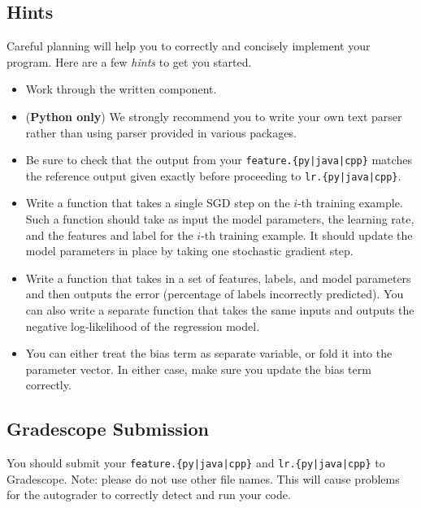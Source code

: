 \documentclass[11pt,addpoints,answers]{exam}
\begin{document}
\subsection{Hints}
Careful planning will help you to correctly and concisely implement your program. Here are a few \emph{hints} to get you started.
\begin{itemize}
    \item Work through the written component.
    \item (\textbf{Python only}) We strongly recommend you to write your own text parser rather than using parser provided in various packages.
    \item Be sure to check that the output from your \texttt{feature.\{py|java|cpp\}} matches the reference output given exactly before proceeding to \texttt{lr.\{py|java|cpp\}}.
    \item Write a function that takes a single SGD step on the $i$-th training example. Such a function should take as input the model parameters, the learning rate, and the features and label for the $i$-th training example. It should update the model parameters in place by taking one stochastic gradient step.
    \item Write a function that takes in a set of features, labels, and model parameters and then outputs the error (percentage of labels incorrectly predicted). You can also write a separate function that takes the same inputs and outputs the negative log-likelihood of the regression model.
    \item You can either treat the bias term as separate variable, or fold it into the parameter vector. In either case, make sure you update the bias term correctly.  
\end{itemize}

\subsection{Gradescope Submission}

You should submit your \texttt{feature.\{py|java|cpp\}} and %
\texttt{lr.\{py|java|cpp\}} to Gradescope.
Note: please do not use other file names. This will cause problems for the autograder to correctly detect and run your code.

    
    
\end{document}
